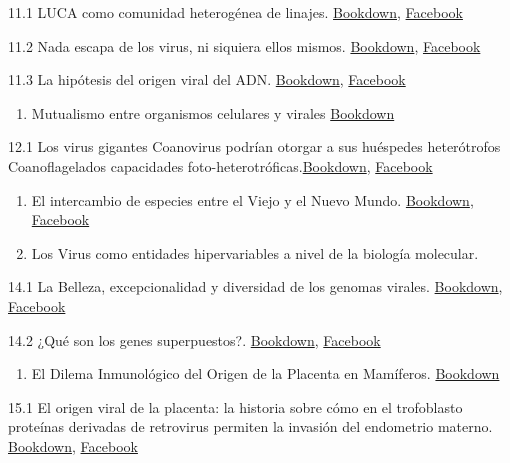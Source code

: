 \documentclass[
  12pt, krantz2,
  spanish,
]{krantz}
\providecommand{\tightlist}{%
  \setlength{\itemsep}{0pt}\setlength{\parskip}{0pt}}
\begin{document}
11.1 LUCA como comunidad heterogénea de linajes. \href{}{Bookdown}, \href{https://www.facebook.com/permalink.php?story_fbid=180759156982240\&id=107088044349352}{Facebook}

11.2 Nada escapa de los virus, ni siquiera ellos mismos. \href{}{Bookdown}, \href{https://www.facebook.com/permalink.php?story_fbid=216494243408731\&id=107088044349352}{Facebook}

11.3 La hipótesis del origen viral del ADN. \href{}{Bookdown}, \href{https://www.facebook.com/BioViral/posts/218632920264025}{Facebook}

\begin{enumerate}
\def\labelenumi{\arabic{enumi}.}
\setcounter{enumi}{11}
\tightlist
\item
  Mutualismo entre organismos celulares y virales \href{}{Bookdown}
\end{enumerate}

12.1 Los virus gigantes Coanovirus podrían otorgar a sus huéspedes heterótrofos Coanoflagelados capacidades foto-heterotróficas.\href{}{Bookdown}, \href{https://www.facebook.com/permalink.php?story_fbid=184190396639116\&id=107088044349352}{Facebook}

\begin{enumerate}
\def\labelenumi{\arabic{enumi}.}
\setcounter{enumi}{12}
\item
  El intercambio de especies entre el Viejo y el Nuevo Mundo. \href{}{Bookdown}, \href{https://www.facebook.com/permalink.php?story_fbid=184862273238595\&id=107088044349352}{Facebook}
\item
  Los Virus como entidades hipervariables a nivel de la biología molecular.
\end{enumerate}

14.1 La Belleza, excepcionalidad y diversidad de los genomas virales. \href{}{Bookdown}, \href{https://www.facebook.com/permalink.php?story_fbid=193816995676456\&id=107088044349352}{Facebook}

14.2 ¿Qué son los genes superpuestos?. \href{}{Bookdown}, \href{https://www.facebook.com/permalink.php?story_fbid=215736123484543\&id=107088044349352}{Facebook}

\begin{enumerate}
\def\labelenumi{\arabic{enumi}.}
\setcounter{enumi}{14}
\tightlist
\item
  El Dilema Inmunológico del Origen de la Placenta en Mamíferos. \href{}{Bookdown}
\end{enumerate}

15.1 El origen viral de la placenta: la historia sobre cómo en el trofoblasto proteínas derivadas de retrovirus permiten la invasión del endometrio materno. \href{}{Bookdown}, \href{https://fb.watch/3nTBh_kCbc/}{Facebook}
\end{document}
